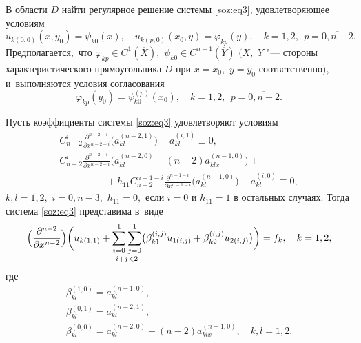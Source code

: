 \hypertarget{soz:task1}{}

\begin{task}[1]В области $D$ найти регулярное решение системы \eqref{soz:eq3}{\rm ,}
удовлетворяющее условиям
\begin{equation}
u_{k(0, 0)}(x, y_{0})=\psi_{k0}(x),\quad 
u_{k(p, 0)}(x_{0}, y)=\varphi_{kp}(y),\quad   k=1, 2,\ \ p=\overline{0, n-2}.
\label{soz:eq4}
\end{equation}
Предполагается$,$ что $\varphi_{kp} \in C^{1}(\overline{X}),$ 
$\psi_{k0} \in C^{n-1}(\overline{Y})$ 
$ (X,$ $Y$ "--- стороны характеристического прямоугольника $D$ при $ x=x_{0},$  $ y=y_{0}$ соответственно$),$ и~выполняются условия согласования
\begin{equation*}
\varphi_{kp}(y_{0})=\psi_{k0}^{(p)}(x_{0}),\quad  k=1, 2,\ \ p=\overline{0, n-2}.
\end{equation*}

\end{task}

\hypertarget{soz:th1}{}

\medskip
\begin{theorem}[1]Пусть коэффициенты системы \eqref{soz:eq3}  удовлетворяют условиям
\begin{equation}
\label{soz:eq5}
\begin{array}{l}
\displaystyle
C_{n-2}^{i}\frac{\partial^{n-2-i}}{\partial x^{n-2-i}} \bigl(a_{kl}^{(n-2,1)} \bigr)-a_{kl}^{(i,1)}\equiv0,\\
\displaystyle
C_{n-2}^{i}\frac{\partial^{n-2-i}}{\partial x^{n-2-i}} \bigl(a_{kl}^{(n-2,0)}-(n-2)a_{klx}^{(n-1,0)} \bigr)+
\\
\displaystyle
\hspace{2cm}
+h_{11}C_{n-2}^{n-1-i}\frac{\partial^{n-1-i}}{\partial x^{n-1-i}} \bigl(a_{kl}^{(n-1,0)}\bigr)-a_{kl}^{(i,0)}\equiv0,
\end{array}
\end{equation}
 $k, l=1, 2, $ $i=\overline{0, n-3},$ 
 $h_{11}=0,$  если $i=0$ и $h_{11}=1$ в остальных случаях$.$ 
Тогда система \eqref{soz:eq3}  представима в~виде
\begin{equation}
\label{soz:eq6}
\Bigl(\frac{\partial^{n-2}}{\partial x^{n-2}}\Bigr)
\biggl(u_{k(1,1)}+\mathop{\sum\limits_{i=0}^{1}\sum\limits_{j=0}^{1}}\limits_{i + j < 2} \bigl(\beta_{k1}^{(i,j)}u_{1(i,j)}+\beta_{k2}^{(i,j)}u_{2(i,j)} \bigr)\biggr)=f_{k}, \quad  k=1, 2,
\end{equation}
 где
\begin{equation}
\label{soz:eq7}
\begin{array}{l}
\beta_{kl}^{(1,0)}=a_{kl}^{(n-1,0)},\\[2mm] 
 \beta_{kl}^{(0,1)}=a_{kl}^{(n-2,1)},\\[2mm]
 \beta_{kl}^{(0,0)}=a_{kl}^{(n-2,0)}-(n-2)a_{klx}^{(n-1,0)},\quad  k, l=1, 2.
\end{array}
\end{equation}

\end{theorem} 

